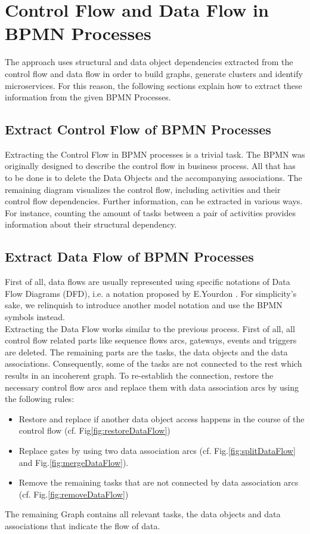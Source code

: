 

\section{Control Flow and Data Flow in BPMN Processes}
\label{ch:PrepApproach:ControlDataFlowBPMNProcess}
The approach uses structural and data object dependencies extracted from the control flow and data flow in order to build graphs, generate clusters and identify microservices. For this reason, the following sections explain how to extract these information from the given BPMN Processes. 

\subsection{Extract Control Flow of BPMN Processes}
Extracting the Control Flow in BPMN processes is a trivial task. The BPMN was originally designed to describe the control flow in business process. All that has to be done is to delete the Data Objects and the accompanying associations. The remaining diagram visualizes the control flow, including activities and their control flow dependencies. Further information, can be extracted in various ways. For instance, counting the amount of tasks between a pair of activities provides information about their structural dependency.

\subsection{Extract Data Flow of BPMN Processes}
First of all, data flows are usually represented using specific notations of Data Flow Diagrams (DFD), i.e. a notation proposed by E.Yourdon \cite{YourdonDFD}. For simplicity's sake, we relinquish to introduce another model notation and use the BPMN symbols instead. \\
Extracting the Data Flow works similar to the previous process. First of all, all control flow related parts like sequence flows arcs, gateways, events and triggers are deleted. The remaining parts are the tasks, the data objects and the data associations. Consequently, some of the tasks are not connected to the rest which results in an incoherent graph. To re-establish the connection, restore the necessary control flow arcs and replace them with data association arcs by using the following rules:
\begin{itemize}
	\item Restore and replace if another data object access happens in the course of the control flow (cf. Fig\ref{fig:restoreDataFlow})
	\item Replace gates by using two data association arcs (cf. Fig.\ref{fig:splitDataFlow} and Fig.\ref{fig:mergeDataFlow}). 
	\item Remove the remaining tasks that are not connected by data association arcs (cf. Fig.\ref{fig:removeDataFlow})
	
\end{itemize}
The remaining Graph contains all relevant tasks, the data objects and data associations that indicate the flow of data.

